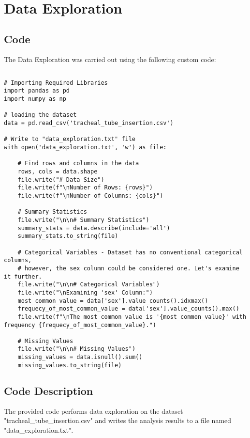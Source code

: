\documentclass[11pt]{article}
\begin{document}
\section{Data Exploration}
\subsection{{Code}}
The Data Exploration was carried out using the following custom code:

\begin{verbatim}

# Importing Required Libraries
import pandas as pd
import numpy as np

# loading the dataset
data = pd.read_csv('tracheal_tube_insertion.csv')

# Write to "data_exploration.txt" file
with open('data_exploration.txt', 'w') as file:

    # Find rows and columns in the data
    rows, cols = data.shape
    file.write("# Data Size")
    file.write(f"\nNumber of Rows: {rows}")
    file.write(f"\nNumber of Columns: {cols}")

    # Summary Statistics
    file.write("\n\n# Summary Statistics")
    summary_stats = data.describe(include='all')
    summary_stats.to_string(file)

    # Categorical Variables - Dataset has no conventional categorical columns,
    # however, the sex column could be considered one. Let's examine it further.
    file.write("\n\n# Categorical Variables")
    file.write("\nExamining 'sex' Column:")
    most_common_value = data['sex'].value_counts().idxmax()
    frequecy_of_most_common_value = data['sex'].value_counts().max()
    file.write(f"\nThe most common value is '{most_common_value}' with frequency {frequecy_of_most_common_value}.")
      
    # Missing Values
    file.write("\n\n# Missing Values")
    missing_values = data.isnull().sum()
    missing_values.to_string(file)

\end{verbatim}

\subsection{Code Description}

The provided code performs data exploration on the dataset "tracheal\_tube\_insertion.csv" and writes the analysis results to a file named "data\_exploration.txt".
\end{document}
